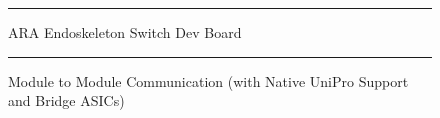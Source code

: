 \begin{figure}[htbp]
  \centering
    \rule{35em}{0.5pt}
  \caption[ARA Endoskeleton Switch Board]{ARA Endoskeleton Switch Dev Board}
  \label{fig:endo}
\end{figure}

\begin{figure}[htbp]
  \centering
     \rule{35em}{0.8pt}
  \caption[Module to Module Communication (with Native UniPro Support and Bridge ASICs)]{Module to Module Communication (with Native UniPro Support and Bridge ASICs)}
  \label{fig:endo}
\end{figure}

